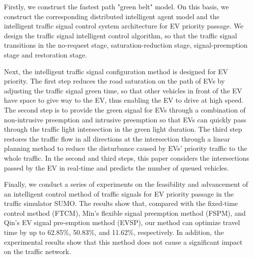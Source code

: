 
Firstly, we construct the fastest path "green belt" model. On this basis, we construct the corresponding distributed intelligent agent model and the intelligent traffic signal control system architecture for EV priority passage.  We design the traffic signal intelligent control algorithm, so that the traffic signal transitions in the no-request stage, saturation-reduction stage, signal-preemption stage and restoration stage.

Next, the intelligent traffic signal configuration method is designed for EV priority. The first step reduces the road saturation on the path of EVs by adjusting the traffic signal green time, so that other vehicles in front of the EV have space to give way to the EV, thus enabling the EV to drive at high speed. The second step is to provide the green signal for EVs through a combination of non-intrusive preemption and intrusive preemption so that EVs can quickly pass through the traffic light intersection in the green light duration. The third step restores the traffic flow in all directions at the intersection through a linear planning method to reduce the disturbance caused by EVs' priority traffic to the whole traffic. In the second and third steps, this paper considers the intersections passed by the EV in real-time and predicts the number of queued vehicles.


Finally, we conduct a series of experiments on the feasibility and advancement of an intelligent control method of traffic signals for EV priority passage in the traffic simulator SUMO. The results show that, compared with the fixed-time control method (FTCM), Min's flexible signal preemption method (FSPM), and Qin's EV signal pre-emption method (EVSP), our method can optimize travel time by up to 62.85\%, 50.83\%, and 11.62\%, respectively. In addition, the experimental results show that this method does not cause a significant impact on the traffic network.




